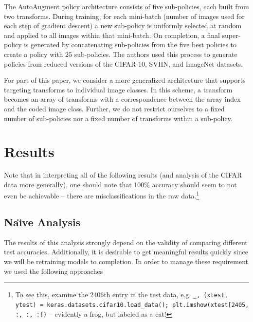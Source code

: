 \documentclass[10pt,twocolumn,letterpaper]{article}
\begin{document}
  The AutoAugment policy architecture consists of five sub-policies, each built from two transforms. During training, for each mini-batch (number of images used for each step of gradient descent) a new sub-policy is uniformly selected at random and applied to all images within that mini-batch. On completion, a final super-policy is generated by concatenating sub-policies from the five best policies to create a policy with $25$ sub-policies. The authors used this process to generate policies from reduced versions of the CIFAR-10, SVHN, and ImageNet datasets.

  For part of this paper, we consider a more generalized architecture that supports targeting transforms to individual image classes. In this scheme, a transform becomes an array of transforms with a correspondence between the array index and the coded image class. Further, we do not restrict ourselves to a fixed number of sub-policies nor a fixed number of transforms within a sub-policy.

\section{Results}

  Note that in interpreting all of the following results (and analysis of the CIFAR data more generally), one should note that 100\% accuracy should seem to not even be achievable -- there are misclassifications in the raw data.\footnote{To see this, examine the 2406th entry in the test data, e.g. \texttt{\_, (xtest, ytest) = keras.datasets.cifar10.load\_data(); plt.imshow(xtest[2405, :, :, :])} -- evidently a frog, but labeled as a cat!}

	

  \subsection{Na\"{\i}ve Analysis}
    The results of this analysis strongly depend on the validity of comparing different test accuracies. Additionally, it is desirable to get meaningful results quickly since we will be retraining models to completion. In order to manage these requirement we used the following approaches
\end{document}
